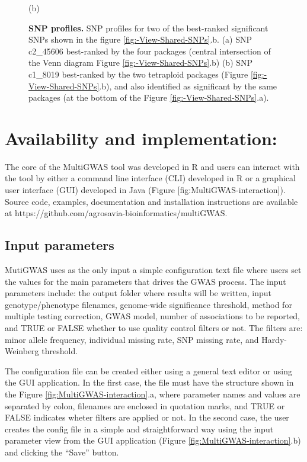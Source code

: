 \documentclass{article}
\begin{document}
\begin{figure}[H]
\begin{minipage}[t]{1\columnwidth}
\begin{minipage}[t]{0.5\columnwidth}
\begin{center}
(b)
\par\end{center}%
\end{minipage}%
\end{minipage}

\caption{\textbf{\scriptsize{}SNP profiles. }{\scriptsize{}SNP profiles for two of the best-ranked significant SNPs shown in the figure \ref{fig:-View-Shared-SNPs}.b. (a) SNP c2\_45606 best-ranked by the four packages (central intersection of the Venn diagram Figure \ref{fig:-View-Shared-SNPs}.b) (b) SNP c1\_8019 best-ranked by the two tetraploid packages (Figure \ref{fig:-View-Shared-SNPs}.b), and also identified as significant by the same packages (at the bottom of the Figure \ref{fig:-View-Shared-SNPs}.a). \label{fig:SNP-profiles}}}
\end{figure}

\section{Availability and implementation:} 
The core of the MultiGWAS tool was developed in R and users can interact with the tool by either a command line interface (CLI) developed in R or a graphical user interface (GUI) developed in Java (Figure [fig:MultiGWAS-interaction]). Source code, examples, documentation and installation instructions are available at https://github.com/agrosavia-bioinformatics/multiGWAS. 

\subsection{Input parameters}
MutiGWAS uses as the only input a simple configuration text file where users set the values for the main parameters that drives the GWAS process. The input parameters include: the output folder where results will be written, input genotype/phenotype filenames, genome-wide significance threshold, method for multiple testing correction, GWAS model, number of associations to be reported, and TRUE or FALSE whether to use quality control filters or not. The filters are: minor allele frequency, individual missing rate, SNP missing rate, and Hardy-Weinberg threshold.

The configuration file can be created either using a general text editor or using the GUI application. In the first case, the file must have the structure shown in the Figure \ref{fig:MultiGWAS-interaction}.a, where parameter names and values are separated by colon, filenames are enclosed in quotation marks, and TRUE or FALSE indicates wheter filters are applied or not. In the second case, the user creates the config file in a simple and straightforward way using the input parameter view from the GUI application (Figure \ref{fig:MultiGWAS-interaction}.b) and clicking the ``Save'' button.
\end{document}
